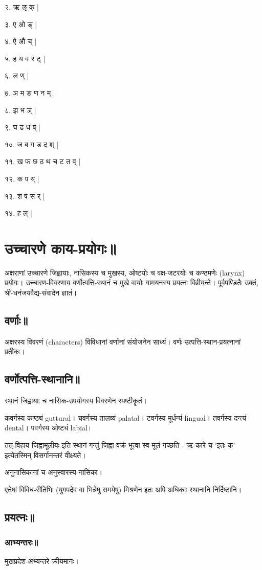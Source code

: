 \documentclass[oneside, article]{memoir}
\begin{document}
२. ऋ ऌ क् |

३. ए ओ ङ् |

४. ऐ औ च् |

५. ह य व र ट् |

६. ल ण् |

७. ञ म ङ ण न म् |

८. झ भ ञ् |

९. घ ढ ध ष् |

१०. ज ब ग ड द श् |

११. ख फ छ ठ थ च ट त व् |

१२. क प य् |

१३. श ष स र् |

१४. ह ल् |

\section{उच्चारणे काय-प्रयोगः॥}
अक्षराणां उच्चारणे जिह्वायाः, नासिकस्य च मुखस्य, ओष्टयोः च वक्ष-जटरयोः च कण्ठमणेः‌ (larynx) प्रयोगः। उच्चारण-विवरणाय वर्णोत्पत्ति-स्थानं च मुखे वायोः‌ गामयनस्य प्रयत्नः विव्रीयन्ते। पूर्वपण्डितैः उक्तं, श्री-धनंजयवैद्य-संवादेन ज्ञातं।

\subsection{वर्णाः॥}
अक्षरस्य विवरणं (characters) विविधानां वर्णानां संयोजनेन साध्यं। वर्णः उत्पत्ति-स्थान-प्रयत्नानां प्रतीकः।

\subsection{वर्णोत्पत्ति-स्थानानि॥}
स्थानं जिह्वायाः च नासिक-उपयोगस्य विवरणेन स्पष्टीकॄतं।

कवर्गस्य कण्ठ्यं guttural। चवर्गस्य तालव्यं palatal। टवर्गस्य मूर्धन्यं lingual। तवर्गस्य दन्त्यं dental। पवर्गस्य ओष्ट्यं labial।

तत्-विहाय जिह्वामूलीयः इति स्थानं गन्तुं जिह्वा वक्रं भूत्वा स्व-मूलं गच्छति - ऋ-कारे च 'इतः क' इत्येतस्मिन् विसर्गानन्तरं वीक्ष्यते।

अनुनासिकानां च अनुस्वारस्य नासिका।

एतेषां विविध-रीतिभिः (युगपदेव वा भिन्नेषु समयेषु) मिश्रणेन इतः अपि अधिकाः स्थानानि निर्दिष्टानि।

\subsection{प्रयत्नः॥}
\subsubsection{आभ्यन्तरः॥}
मुखप्रदेश-अभ्यन्तरे क्रीयमानः।
\end{document}
